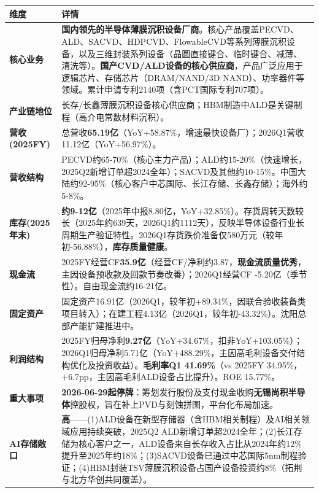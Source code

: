 \begin{exhibitbox}
\centering
\scriptsize
\renewcommand{\arraystretch}{1.20}
\begin{tabularx}{\exhibitboxwidth}{>{\bfseries}p{2.2cm} >{\raggedright\arraybackslash\sloppy\hspace{0pt}}X}
\toprule
\textbf{维度} & \textbf{详情} \\
\midrule
核心业务 & \textbf{国内领先的半导体薄膜沉积设备厂商}。核心产品覆盖PECVD、ALD、SACVD、HDPCVD、FlowableCVD等系列薄膜沉积设备，以及三维封装系列设备（晶圆直接键合、临时键合、减薄、清洗等）。\textbf{国产CVD/ALD设备的核心供应商}，产品广泛应用于逻辑芯片、存储芯片（DRAM/NAND/3D NAND）、功率器件等领域。累计申请专利2140项（含PCT国际专利707项）。 \\
产业链地位 & 长存/长鑫薄膜沉积设备核心供应商；HBM制造中ALD是关键制程（高介电常数材料沉积）。 \\
营收(2025FY) & 总营收\textbf{65.19亿}（YoY+58.87\%，增速最快设备厂）；2026Q1营收11.12亿（YoY+56.97\%）。 \\
营收结构 & PECVD约65-70\%（核心主力产品）；ALD约15-20\%（快速增长，2025Q2新增订单超2024全年）；SACVD及其他约10-15\%。中国大陆约92-95\%（核心客户中芯国际、长江存储、长鑫存储）；海外约5-8\%。 \\
库存(2025年末) & \textbf{约9-12亿}（2025年中报8.80亿，YoY+32.85\%）。存货周转天数较长（2025年约639天，2026Q1约1112天），反映半导体设备行业长周期生产验证特性。2026Q1存货跌价准备仅580万元（较年初-56.88\%），\textbf{库存质量健康}。 \\
现金流 & 2025FY经营CF\textbf{35.9亿}（经营CF/净利约3.87，\textbf{现金流质量优秀}，主因设备预收款及回款节奏改善）；2026Q1经营CF -5.20亿（季节性）。自由现金流约16-21亿。 \\
固定资产 & 固定资产16.91亿（2026Q1，较年初+89.34\%，因联合验收装备类项目转入）；在建工程4.13亿（2026Q1，较年初-43.32\%）。沈阳总部产能扩建推进中。 \\
利润结构 & 2025FY归母净利\textbf{9.27亿}（YoY+34.67\%，扣非YoY+103.05\%）；2026Q1归母净利5.71亿（YoY+488.29\%，主因高毛利设备交付结构优化及投资收益）。\textbf{毛利率Q1 41.69\%}（vs 2025FY 34.95\%，+6.7pp，主因高毛利ALD设备占比提升）。ROE 15.77\%。 \\
\midrule
\rowcolor{riskamber!8}
\textbf{重大事项} & \textbf{2026-06-29起停牌}：筹划发行股份及支付现金收购\textbf{无锡尚积半导体}控股权，旨在补上PVD与刻蚀拼图，平台化布局加速。 \\
\midrule
AI存储敞口 & \textbf{高}——(1)ALD设备在新型存储器（含HBM相关制程）及AI相关领域应用持续突破，2025Q2 ALD新增订单超2024全年；(2)长江存储为核心客户之一，ALD设备来自长存收入占比从2024年约12\%提升至2025年约18\%；(3)SACVD设备已通过中芯国际5nm制程验证；(4)HBM封装TSV薄膜沉积设备占国产设备投资约8\%（拓荆与北方华创共同覆盖）。 \\
\bottomrule
\end{tabularx}
\end{exhibitbox}

